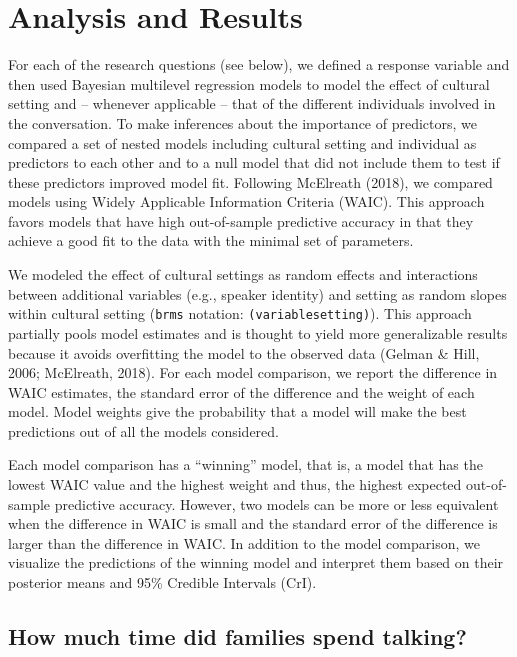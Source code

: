 \documentclass[
  man,floatsintext]{apa6}
\begin{document}
\hypertarget{analysis-and-results}{%
\section{Analysis and Results}\label{analysis-and-results}}

For each of the research questions (see below), we defined a response variable and then used Bayesian multilevel regression models to model the effect of cultural setting and -- whenever applicable -- that of the different individuals involved in the conversation. To make inferences about the importance of predictors, we compared a set of nested models including cultural setting and individual as predictors to each other and to a null model that did not include them to test if these predictors improved model fit. Following McElreath (2018), we compared models using Widely Applicable Information Criteria (WAIC). This approach favors models that have high out-of-sample predictive accuracy in that they achieve a good fit to the data with the minimal set of parameters.

We modeled the effect of cultural settings as random effects and interactions between additional variables (e.g., speaker identity) and setting as random slopes within cultural setting (\texttt{brms} notation: \texttt{(variable\textbar{}setting)}). This approach partially pools model estimates and is thought to yield more generalizable results because it avoids overfitting the model to the observed data (Gelman \& Hill, 2006; McElreath, 2018). For each model comparison, we report the difference in WAIC estimates, the standard error of the difference and the weight of each model. Model weights give the probability that a model will make the best predictions out of all the models considered.

Each model comparison has a ``winning'' model, that is, a model that has the lowest WAIC value and the highest weight and thus, the highest expected out-of-sample predictive accuracy. However, two models can be more or less equivalent when the difference in WAIC is small and the standard error of the difference is larger than the difference in WAIC. In addition to the model comparison, we visualize the predictions of the winning model and interpret them based on their posterior means and 95\% Credible Intervals (CrI).

\hypertarget{how-much-time-did-families-spend-talking}{%
\subsection{How much time did families spend talking?}\label{how-much-time-did-families-spend-talking}}
\end{document}
